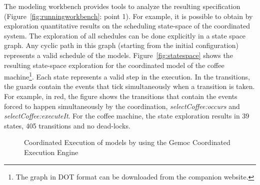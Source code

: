 The modeling workbench provides tools to analyze the resulting \ccsl specification (Figure~\ref{fig:runningworkbench}: point 1). For example, it is possible to obtain by exploration quantitative results on the scheduling state-space of the coordinated system. The exploration of all schedules can be done explicitly in a state space graph. Any cyclic path in this graph (starting from the initial configuration) represents a valid schedule of the models. Figure~\ref{fig:statespace} shows the resulting state-space exploration for the coordinated model of the coffee machine\footnote{The graph in DOT format can be downloaded from the companion website.}. Each state represents a valid step in the execution. In the transitions, the guards contain the events that tick simultaneously when a transition is taken. For example, in red, the figure shows the transitions that contain the events forced to happen simultaneously by the coordination, \eg \emph{selectCoffee:occurs} and \emph{selectCoffee:executeIt}. For the coffee machine, the state exploration results in 39 states, 405 transitions and no dead-locks.    


\begin{figure}[]
	\centering
	\caption{Coordinated Execution of models by using the Gemoc Coordinated Execution Engine}
	\label{fig:subfigureExample1}
\end{figure}

